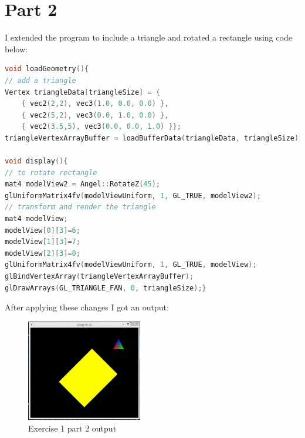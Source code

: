 \section{Part 2}
I extended the program to include a triangle and rotated a rectangle using code below:
\begin{lstlisting}[language=cpp, caption={Exercise 1 part 1 code changes}]
void loadGeometry(){
// add a triangle
Vertex triangleData[triangleSize] = {
	{ vec2(2,2), vec3(1.0, 0.0, 0.0) },
	{ vec2(5,2), vec3(0.0, 1.0, 0.0) },
	{ vec2(3.5,5), vec3(0.0, 0.0, 1.0) }};
triangleVertexArrayBuffer = loadBufferData(triangleData, triangleSize);}

void display(){
// to rotate rectangle
mat4 modelView2 = Angel::RotateZ(45);
glUniformMatrix4fv(modelViewUniform, 1, GL_TRUE, modelView2);
// transform and render the triangle
mat4 modelView;
modelView[0][3]=6;
modelView[1][3]=7;
modelView[2][3]=0;
glUniformMatrix4fv(modelViewUniform, 1, GL_TRUE, modelView);
glBindVertexArray(triangleVertexArrayBuffer);
glDrawArrays(GL_TRIANGLE_FAN, 0, triangleSize);}
\end{lstlisting}
After applying these changes I got an output: \\
\begin{figure}[ht!]
	\begin{center}
		\includegraphics[width=0.45\textwidth]{figures/exercise_1_part_2}
	\end{center}
	\caption{Exercise 1 part 2 output}
\end{figure}